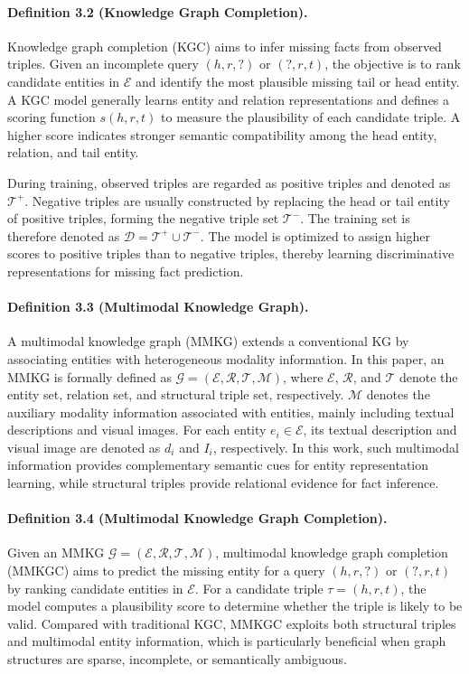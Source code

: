 \documentclass[pdflatex,sn-mathphys-num]{sn-jnl}
\begin{document}
\paragraph{Definition 3.2 (Knowledge Graph Completion).}
Knowledge graph completion (KGC) aims to infer missing facts from observed triples. Given an incomplete query $(h,r,?)$ or $(?,r,t)$, the objective is to rank candidate entities in $\mathcal{E}$ and identify the most plausible missing tail or head entity. A KGC model generally learns entity and relation representations and defines a scoring function $s(h,r,t)$ to measure the plausibility of each candidate triple. A higher score indicates stronger semantic compatibility among the head entity, relation, and tail entity.

During training, observed triples are regarded as positive triples and denoted as $\mathcal{T}^{+}$. Negative triples are usually constructed by replacing the head or tail entity of positive triples, forming the negative triple set $\mathcal{T}^{-}$. The training set is therefore denoted as $\mathcal{D}=\mathcal{T}^{+}\cup\mathcal{T}^{-}$. The model is optimized to assign higher scores to positive triples than to negative triples, thereby learning discriminative representations for missing fact prediction.

\paragraph{Definition 3.3 (Multimodal Knowledge Graph).}
A multimodal knowledge graph (MMKG) extends a conventional KG by associating entities with heterogeneous modality information. In this paper, an MMKG is formally defined as
$\mathcal{G}=(\mathcal{E},\mathcal{R},\mathcal{T},\mathcal{M})$,
where $\mathcal{E}$, $\mathcal{R}$, and $\mathcal{T}$ denote the entity set, relation set, and structural triple set, respectively. $\mathcal{M}$ denotes the auxiliary modality information associated with entities, mainly including textual descriptions and visual images. For each entity $e_i\in\mathcal{E}$, its textual description and visual image are denoted as $d_i$ and $I_i$, respectively. In this work, such multimodal information provides complementary semantic cues for entity representation learning, while structural triples provide relational evidence for fact inference.

\paragraph{Definition 3.4 (Multimodal Knowledge Graph Completion).}
Given an MMKG $\mathcal{G}=(\mathcal{E},\mathcal{R},\mathcal{T},\mathcal{M})$, multimodal knowledge graph completion (MMKGC) aims to predict the missing entity for a query $(h,r,?)$ or $(?,r,t)$ by ranking candidate entities in $\mathcal{E}$. For a candidate triple $\tau=(h,r,t)$, the model computes a plausibility score to determine whether the triple is likely to be valid. Compared with traditional KGC, MMKGC exploits both structural triples and multimodal entity information, which is particularly beneficial when graph structures are sparse, incomplete, or semantically ambiguous.
\end{document}
